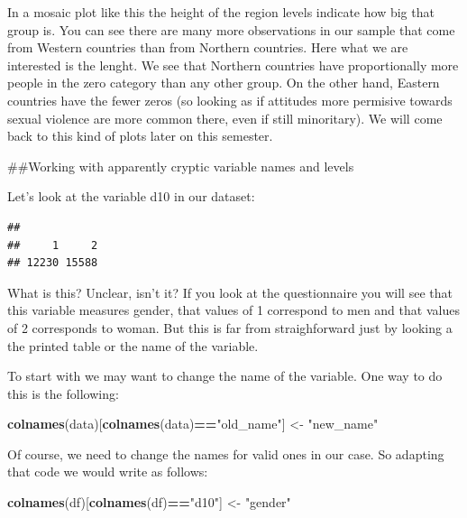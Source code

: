 \documentclass[]{book}
\newenvironment{Shaded}{\begin{snugshade}}{\end{snugshade}}
\newcommand{\KeywordTok}[1]{\textcolor[rgb]{0.13,0.29,0.53}{\textbf{#1}}}
\newcommand{\NormalTok}[1]{#1}
\newcommand{\OperatorTok}[1]{\textcolor[rgb]{0.81,0.36,0.00}{\textbf{#1}}}
\newcommand{\StringTok}[1]{\textcolor[rgb]{0.31,0.60,0.02}{#1}}
\theoremstyle{definition}
\theoremstyle{definition}
\theoremstyle{definition}
\theoremstyle{remark}
\begin{document}
In a mosaic plot like this the height of the region levels indicate how
big that group is. You can see there are many more observations in our
sample that come from Western countries than from Northern countries.
Here what we are interested is the lenght. We see that Northern
countries have proportionally more people in the zero category than any
other group. On the other hand, Eastern countries have the fewer zeros
(so looking as if attitudes more permisive towards sexual violence are
more common there, even if still minoritary). We will come back to this
kind of plots later on this semester.

\#\#Working with apparently cryptic variable names and levels

Let's look at the variable d10 in our dataset:

\begin{Shaded}
\end{Shaded}

\begin{verbatim}
## 
##     1     2 
## 12230 15588
\end{verbatim}

What is this? Unclear, isn't it? If you look at the questionnaire you
will see that this variable measures gender, that values of 1 correspond
to men and that values of 2 corresponds to woman. But this is far from
straighforward just by looking a the printed table or the name of the
variable.

To start with we may want to change the name of the variable. One way to
do this is the following:

\begin{Shaded}
\begin{Highlighting}[]
\KeywordTok{colnames}\NormalTok{(data)[}\KeywordTok{colnames}\NormalTok{(data)}\OperatorTok{==}\StringTok{"old_name"}\NormalTok{] <-}\StringTok{ "new_name"}
\end{Highlighting}
\end{Shaded}

Of course, we need to change the names for valid ones in our case. So
adapting that code we would write as follows:

\begin{Shaded}
\begin{Highlighting}[]
\KeywordTok{colnames}\NormalTok{(df)[}\KeywordTok{colnames}\NormalTok{(df)}\OperatorTok{==}\StringTok{"d10"}\NormalTok{] <-}\StringTok{ "gender"}
\end{Highlighting}
\end{Shaded}
\end{document}
